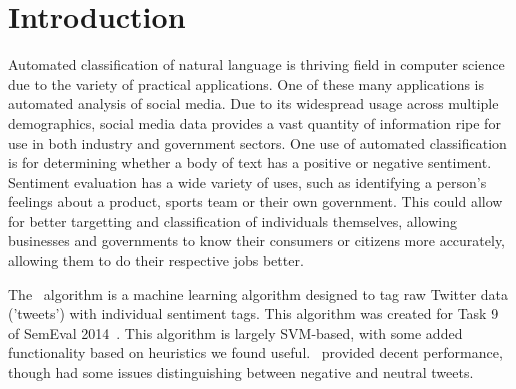 \section{Introduction}
	Automated classification of natural language is thriving field in computer science due to the variety of practical applications.  One of these many applications is automated analysis of social media. Due to its widespread usage across multiple demographics, social media data provides a vast quantity of information ripe for use in both industry and government sectors.  One use of automated classification is for determining whether a body of text has a positive or negative sentiment.  Sentiment evaluation has a wide variety of uses, such as identifying a person's feelings about a product, sports team or their own government.  This could allow for better targetting and classification of individuals themselves, allowing businesses and governments to know their consumers or citizens more accurately, allowing them to do their respective jobs better. 
	
   The \AlgName\ algorithm is a machine learning algorithm designed to tag raw Twitter data ('tweets') with individual sentiment tags.  This algorithm was created for Task 9 of SemEval 2014~\cite{rosen}.  This algorithm is largely SVM-based, with some added functionality based on heuristics we found useful.  \AlgName\ provided decent performance, though had some issues distinguishing between negative and neutral tweets. 